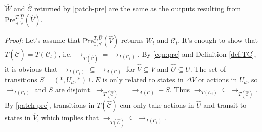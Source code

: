 \begin{theorem}
	$ \widehat{W} $ and $ \widehat{\mathcal{C}} $ returned by \eqref{patch-pre} are the same as the outputs resulting from $ \text{Pre}_{\exists,\forall}^{T,\widehat{U}}(\widehat{V})$.	\label{thm:pre}
\end{theorem}

\emph{Proof:} Let's assume that $ \text{Pre}_{\exists,\forall}^{T,\widehat{U}}(\widehat{V}) $ returns $ W_t $ and $ \mathcal{C}_t $. It's enough to show that $ T(\widehat{\mathcal{C}})= T(\mathcal{C}_t)$, i.e. $ \rightarrow_{T(\widehat{\mathcal{C}})} = \rightarrow_{T(\mathcal{C}_t)} $. By \eqref{eqn:pre} and Definition \ref{def:TC}, it is obvious that $ \rightarrow_{T(\mathcal{C}_t)} \subseteq \rightarrow_{A(\mathcal{C})}$ for $ \widehat{V}\subseteq V $ and $ \widehat{U}\subseteq U $. The set of transitions $ S = (*,U_d,*)\cup E $ is only related to states in $ \Delta V $ or actions in $ U_d $, so $\rightarrow_{T(\mathcal{C}_t)}$ and $ S $ are disjoint. $ \rightarrow_{T(\widehat{\mathcal{C}})}= \rightarrow_{A(\mathcal{C})}-S$. Thus $ \rightarrow_{T(\mathcal{C}_t)}\subseteq \rightarrow_{T(\widehat{\mathcal{C}})}$. By \eqref{patch-pre}, transitions in $ T(\widehat{\mathcal{C}}) $ can only take actions in $ \widehat{U} $ and transit to states in $ \widehat{V} $, which implies that $ \rightarrow_{T(\widehat{\mathcal{C}})}\subseteq \rightarrow_{T(\mathcal{C}_t)} $. \QEDB 


